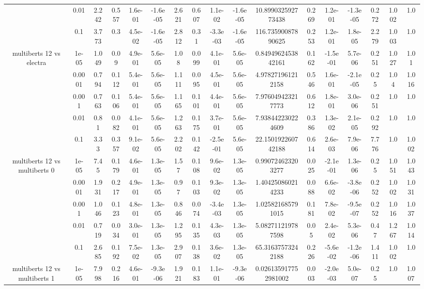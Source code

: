 \begin{tabular}{|c|c|c|c|c|c|c|c|c|c|c|c|c|c|c|c|c|}
 & 0.01 & 2.242 & 0.557 & 1.6e-01 & -1.6e-05 & 2.621 & 0.607 & 1.1e-02 & -1.6e-05 & 10.899032592773438 & 0.269 & 1.2e-01 & -1.3e-05 & 0.272 & 1.002 & 1.0 \\
 & 0.1 & 3.773 & 0.3 & 4.5e-02 & -1.6e-05 & 2.812 & 0.31 & -3.3e-03 & -1.6e-05 & 116.73590087890625 & 0.253 & 1.2e-01 & 1.8e-05 & 2.279 & 1.003 & 1.0 \\
\hline
\multirow{5}{*}{multiberts 12 vs electra } & 1e-05 & 1.049 & 0.09 & 4.9e-01 & 5.6e-05 & 1.08 & 0.099 & 4.1e-01 & 5.6e-05 & 0.8494962453842161 & 0.162 & -1.5e-01 & 5.7e-06 & 0.251 & 1.027 & 1.01 \\
 & 0.0001 & 0.794 & 0.112 & 5.4e-01 & 5.6e-05 & 1.111 & 0.095 & 4.5e-01 & 5.6e-05 & 4.978271961212158 & 0.546 & 1.6e-01 & -2.1e-05 & 0.25 & 1.04 & 1.016 \\
 & 0.001 & 0.763 & 0.106 & 5.4e-01 & 5.6e-05 & 1.165 & 0.101 & 4.4e-01 & 5.6e-05 & 7.976049423217773 & 0.612 & 1.8e-01 & 3.0e-06 & 0.251 & 1.0 & 1.0 \\
 & 0.01 & 0.81 & 0.082 & 4.1e-01 & 5.6e-05 & 1.263 & 0.175 & 3.7e-01 & 5.6e-05 & 7.938442230224609 & 0.386 & 1.3e-02 & 2.1e-05 & 0.292 & 1.0 & 1.0 \\
 & 0.1 & 3.33 & 0.357 & 9.1e-02 & 5.6e-05 & 2.202 & 0.142 & -2.5e-01 & 5.6e-05 & 22.150192260742188 & 0.614 & 2.6e-03 & 7.9e-06 & 7.776 & 1.0 & 1.002 \\
\hline
\multirow{5}{*}{multiberts 12 vs multiberts 0} & 1e-05 & 7.45 & 0.179 & 4.6e-01 & 1.3e-05 & 1.57 & 0.108 & 9.6e-02 & 1.3e-05 & 0.990724623203277 & 0.025 & -2.1e-01 & 1.3e-06 & 0.25 & 1.051 & 1.043 \\
 & 0.0001 & 1.931 & 0.217 & 4.9e-01 & 1.3e-05 & 0.97 & 0.103 & 9.3e-02 & 1.3e-05 & 1.404250860214233 & 0.088 & 6.6e-02 & -3.8e-06 & 0.252 & 1.002 & 1.031 \\
 & 0.001 & 1.046 & 0.123 & 4.8e-01 & 1.3e-05 & 0.846 & 0.074 & -3.4e-03 & 1.3e-05 & 1.025821685791015 & 0.181 & 7.8e-02 & -9.5e-07 & 0.252 & 1.016 & 1.037 \\
 & 0.01 & 0.719 & 0.034 & 3.0e-01 & 1.3e-05 & 1.295 & 0.135 & 4.3e-03 & 1.3e-05 & 5.082711219787598 & 0.05 & 2.4e-02 & 5.3e-06 & 0.47 & 1.267 & 1.014 \\
 & 0.1 & 2.685 & 0.192 & 7.5e-02 & 1.3e-05 & 2.907 & 0.138 & 3.6e-02 & 1.3e-05 & 65.31637573242188 & 0.226 & -5.6e-02 & -1.2e-06 & 1.411 & 1.002 & 1.0 \\
\hline
\multirow{5}{*}{multiberts 12 vs multiberts 1} & 1e-05 & 7.998 & 0.216 & 4.6e-01 & -9.3e-06 & 1.921 & 0.183 & 1.1e-01 & -9.3e-06 & 0.026135917752981002 & 0.003 & -2.0e-03 & 5.0e-07 & 0.25 & 1.0 & 1.007 \\

\end{tabular}
